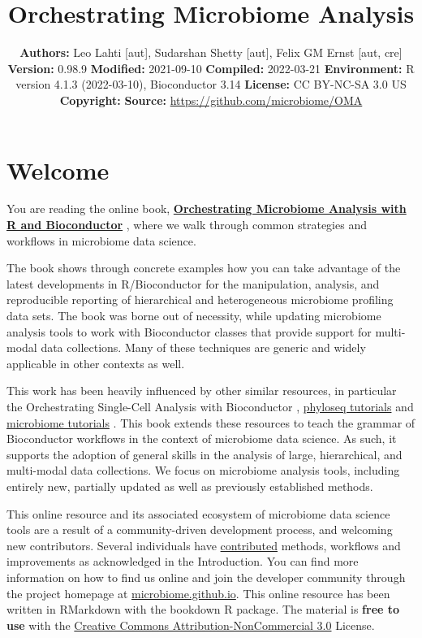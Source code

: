 \documentclass[
]{book}
\title{Orchestrating Microbiome Analysis}
\author{}
\date{\vspace{-2.5em}\textbf{Authors:} Leo Lahti {[}aut{]}, Sudarshan Shetty {[}aut{]}, Felix GM Ernst {[}aut, cre{]} \textbf{Version:} 0.98.9 \textbf{Modified:} 2021-09-10 \textbf{Compiled:} 2022-03-21 \textbf{Environment:} R version 4.1.3 (2022-03-10), Bioconductor 3.14 \textbf{License:} CC BY-NC-SA 3.0 US \textbf{Copyright:} \textbf{Source:} \url{https://github.com/microbiome/OMA}}
\begin{document}
\maketitle

{
\setcounter{tocdepth}{1}
\tableofcontents
}
\hypertarget{welcome}{%
\chapter*{Welcome}\label{welcome}}

You are reading the online book, \href{microbiome.github.io/OMA}{\textbf{Orchestrating Microbiome Analysis
with R and Bioconductor}} \citep{OMA}, where we
walk through common strategies and workflows in microbiome data
science.

The book shows through concrete examples how you can take advantage of
the latest developments in R/Bioconductor for the manipulation,
analysis, and reproducible reporting of hierarchical and heterogeneous
microbiome profiling data sets. The book was borne out of necessity,
while updating microbiome analysis tools to work with Bioconductor
classes that provide support for multi-modal data collections. Many of
these techniques are generic and widely applicable in other contexts
as well.

This work has been heavily influenced by other similar resources, in
particular the Orchestrating Single-Cell Analysis with Bioconductor
\citep{Amezquita2020natmeth}, \href{http://joey711.github.io/phyloseq/tutorials-index}{phyloseq
tutorials}
\citep{Callahan2016} and \href{https://microbiome.github.io/tutorials/}{microbiome
tutorials} \citep{Shetty2019}.
This book extends these resources to teach the grammar of Bioconductor
workflows in the context of microbiome data science. As such, it
supports the adoption of general skills in the analysis of large,
hierarchical, and multi-modal data collections. We focus on microbiome
analysis tools, including entirely new, partially updated as well as
previously established methods.

This online resource and its associated ecosystem of microbiome data
science tools are a result of a community-driven development process,
and welcoming new contributors. Several individuals have
\href{https://github.com/microbiome/OMA/graphs/contributors}{contributed}
methods, workflows and improvements as acknowledged in the
Introduction. You can find more information on how to find us online
and join the developer community through the project homepage at
\href{https://microbiome.github.io}{microbiome.github.io}. This online
resource has been written in RMarkdown with the bookdown R
package. The material is \textbf{free to use} with the \href{https://creativecommons.org/licenses/by-nc/3.0/us/}{Creative Commons
Attribution-NonCommercial
3.0} License.
\end{document}
